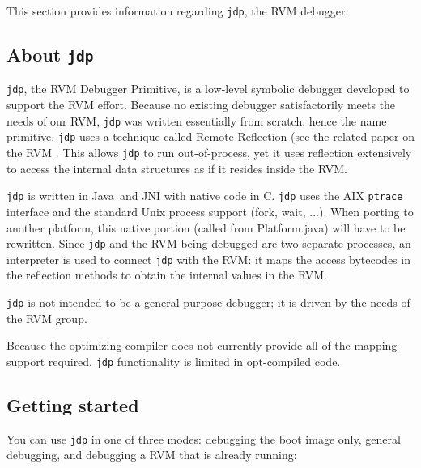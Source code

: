 This section provides information regarding {\tt jdp}, the RVM
debugger.

\subsection{About {\tt jdp}}

  {\tt jdp}, the RVM Debugger Primitive, is a low-level symbolic debugger 
developed to support the
RVM effort.  Because no existing debugger satisfactorily meets the
needs of our RVM, {\tt jdp} was written essentially from scratch, hence the
name primitive.  {\tt jdp} uses a technique called Remote
Reflection (see the related paper on the RVM 
.  This
allows {\tt jdp} to run out-of-process, yet it uses reflection extensively to
access the internal data structures as if it resides inside the RVM.

{\tt jdp} is written in Java\trademark\ and JNI with native code in C.  {\tt jdp}
uses the
AIX {\tt ptrace} interface and the standard Unix process support (fork,
wait, ...).  When porting to another platform, this native portion
(called from Platform.java) will have to be rewritten.  Since {\tt jdp} and
the RVM being debugged are two separate processes, an interpreter is
used to connect {\tt jdp} with the RVM:  it maps the access bytecodes in the
reflection methods to obtain the internal values in the RVM.
  
  {\tt jdp} is not intended to be a general purpose debugger; it is driven
by the needs of the RVM group.  

   Because the optimizing compiler does not currently provide all of
   the mapping support required, {\tt jdp} functionality is limited in
   opt-compiled code. 

\subsection{Getting started}

   You can use {\tt jdp} in one of three modes: debugging the boot image only, 
general debugging, and debugging a RVM that is already running:


